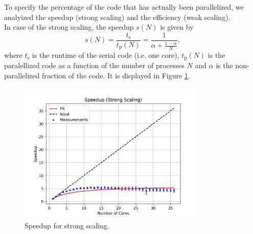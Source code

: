 \documentclass[12pt, a4paper, titlepage]{article}
\newcommand{\der}{\text{d}}
\begin{document}
{%
%
%
%

To specify the percentage of the code that has actually been parallelized, we analyized the speedup (strong scaling) and the efficiency (weak scaling).\\
In case of the strong scaling, the speedup $s(N)$ is given by
\begin{equation}
	s(N) = \frac{t_\text{s}}{t_\text{p}(N)}=\frac{1}{\alpha + \frac{1-\alpha}{N}},
\end{equation}
where $t_\text{s}$ is the runtime of the serial code (i.e. one core), $t_\text{p}(N)$ is the paralellized code as a function of the number of processes $N$ and $\alpha$ is the non-parallelized fraction of the code. It is displayed in Figure \ref{fig:speedup}.\\

\begin{figure}[h!]
\begin{center}
\includegraphics[width=0.8\textwidth]{pictures/speedup_strong.png}
\caption{Speedup for strong scaling.}
\label{fig:speedup}
\end{center}
\end{figure}

}
\end{document}

